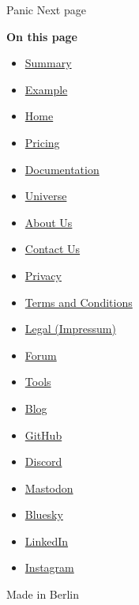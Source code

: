 { Panic } { Next page }

\textbf{On this page}

\begin{itemize}
\tightlist
\item
  \hyperref[summary]{Summary}
\item
  \hyperref[example]{Example}
\end{itemize}

\begin{itemize}
\tightlist
\item
  \href{/}{Home}
\item
  \href{/pricing/}{Pricing}
\item
  \href{/docs/}{Documentation}
\item
  \href{/universe/}{Universe}
\item
  \href{/about/}{About Us}
\item
  \href{/contact/}{Contact Us}
\item
  \href{/privacy/}{Privacy}
\item
  \href{https://typst.app/terms}{Terms and Conditions}
\item
  \href{/legal/}{Legal (Impressum)}
\end{itemize}

\begin{itemize}
\tightlist
\item
  \href{https://forum.typst.app}{Forum}
\item
  \href{/tools/}{Tools}
\item
  \href{/blog/}{Blog}
\item
  \href{https://github.com/typst/}{GitHub}
\item
  \href{https://discord.gg/2uDybryKPe}{Discord}
\item
  \href{https://mastodon.social/@typst}{Mastodon}
\item
  \href{https://bsky.app/profile/typst.app}{Bluesky}
\item
  \href{https://www.linkedin.com/company/typst/}{LinkedIn}
\item
  \href{https://instagram.com/typstapp/}{Instagram}
\end{itemize}

Made in Berlin
